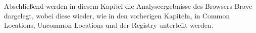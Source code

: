 Abschließend werden in diesem Kapitel die Analyseergebnisse des Browsers Brave dargelegt, wobei diese wieder, wie in den vorherigen Kapiteln, in Common Locations, Uncommon Locations und der Registry unterteilt werden.

